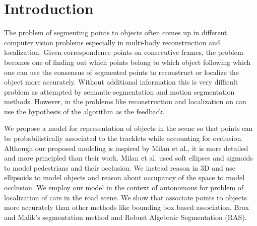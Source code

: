 \section{Introduction}
The problem of segmenting points to objects often comes up in different
computer vision problems especially in multi-body 
reconstruction and localization. Given correspondence points on
consecutive frames, the problem becomes one of finding out which points belong
to which object following which one can use the consensus of segmented points
to reconstruct or localize the object more accurately. Without additional 
information this is very difficult problem as attempted by semantic segmentation 
and motion segmentation methods. However, in the problems like reconstruction and
localization on can use the hypothesis of the algorithm as the feedback.

We propose a model for representation of objects in the scene so that points
can be probabilistically  associated to the tracklets while accounting for occlusion.
Although our proposed modeling is inspired by Milan et
al.\cite{Milan_etal_2014}, it is more detailed and more principled than their
work. Milan et al. used soft ellipses and sigmoids to model pedestrians and
their occlusion. We instead reason in 3D and use ellipsoids to model objects
and reason about occupancy of the space to model occlusion.
We employ our model in the context of autonomous for problem of localization of
cars in the road scene. We show that associate points to objects more
accurately than other methods like bounding box based association, Brox and
Malik's\cite{Brox_Malik_2010} segmentation method and Robust Algebraic
Segmentation (RAS)\cite{Rao_etal_2010}.
